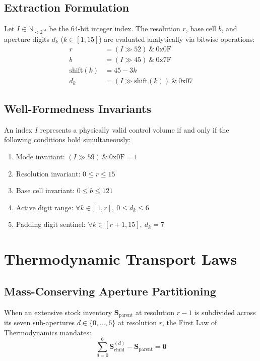\documentclass[10pt,journal,compsoc]{IEEEtran}
\begin{document}
\subsection{Extraction Formulation}
Let $I \in \mathbb{N}_{< 2^{64}}$ be the 64-bit integer index. The resolution $r$, base cell $b$, and aperture digits $d_k$ ($k \in [1, 15]$) are evaluated analytically via bitwise operations:
\begin{align}
r &= (I \gg 52) \ \& \ 0\text{x0F} \\
b &= (I \gg 45) \ \& \ 0\text{x7F} \\
\text{shift}(k) &= 45 - 3k \\
d_k &= (I \gg \text{shift}(k)) \ \& \ 0\text{x07}
\end{align}

\subsection{Well-Formedness Invariants}
An index $I$ represents a physically valid control volume if and only if the following conditions hold simultaneously:
\begin{enumerate}
    \item Mode invariant: $(I \gg 59) \ \& \ 0\text{x0F} = 1$
    \item Resolution invariant: $0 \le r \le 15$
    \item Base cell invariant: $0 \le b \le 121$
    \item Active digit range: $\forall k \in [1, r], \ 0 \le d_k \le 6$
    \item Padding digit sentinel: $\forall k \in [r+1, 15], \ d_k = 7$
\end{enumerate}

\section{Thermodynamic Transport Laws}

\subsection{Mass-Conserving Aperture Partitioning}
When an extensive stock inventory $\mathbf{S}_{\text{parent}}$ at resolution $r-1$ is subdivided across its seven sub-apertures $d \in \{0, \dots, 6\}$ at resolution $r$, the First Law of Thermodynamics mandates:
\begin{equation}
\sum_{d=0}^{6} \mathbf{S}_{\text{child}}^{(d)} - \mathbf{S}_{\text{parent}} = \mathbf{0}
\end{equation}
\end{document}
